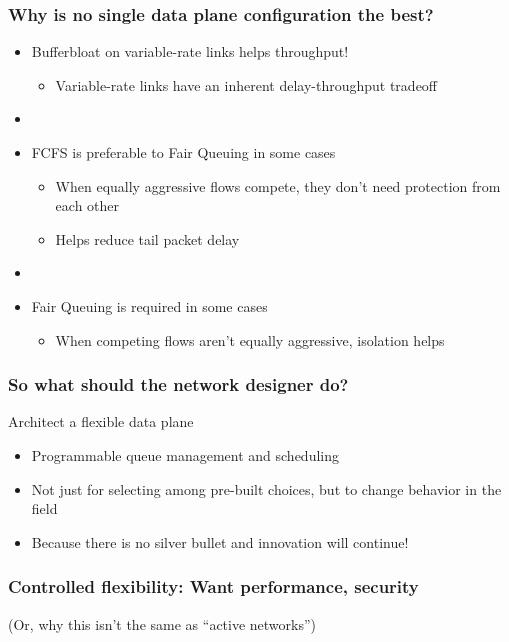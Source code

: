 \begin{Large}
\begin{frame}[plain]
\frametitle{Why is no single data plane configuration the best?}
\begin{itemize}
\item Bufferbloat on variable-rate links helps throughput!
      \begin{itemize}
      \item Variable-rate links have an inherent delay-throughput tradeoff
      \end{itemize} 

\item[] 

\item FCFS is preferable to Fair Queuing in some cases
      \begin{itemize}
      \item When equally aggressive flows compete, they don't need
        protection from each other
        \item Helps reduce tail packet delay
      \end{itemize}

\item[]

\item Fair Queuing is required in some cases
      \begin{itemize}      
      \item When competing flows aren't equally aggressive,
        isolation helps
      \end{itemize}
\end{itemize}
\end{frame}

\begin{frame}[plain]
\frametitle{So what should the network designer do?}
Architect a flexible data plane
\begin{itemize}
\item Programmable queue management and scheduling
\item Not just for selecting among pre-built choices, but to change
  behavior in the field
\item Because there is no silver bullet and innovation will continue!
\end{itemize}
\end{frame}

\begin{frame}[plain]
\frametitle{Controlled flexibility: Want performance, security}

(Or, why this isn't the same as ``active networks'')


\end{frame}
\end{Large}
